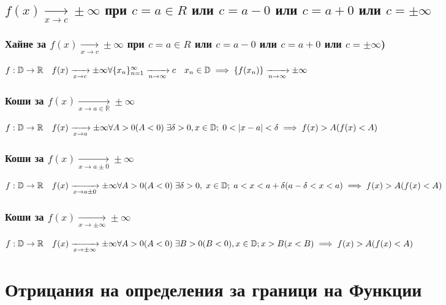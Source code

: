 \documentclass{article}
\newcommand{\pto}[2]{\xrightarrow[#1 \to #2]{}}
\newcommand{\xto}[1]{\pto{x}{#1}}
\newcommand{\nto}[0]{\pto{n}{\infty}}
\newcommand{\R}[0]{\mathbb{R}}
\newcommand{\D}[0]{\mathbb{D}}
\newcommand{\spc}[0]{\quad}
\newcommand{\seq}[1]{\{#1_n\}_{n=1}^{\infty}}
\begin{document}
    \subsection{\(f(x) \xto{c} \pm \infty\) при \(c = a \in R\) или \(c = a - 0\) или \(c = a + 0\) или \(c = \pm \infty\)}
    \subsubsection{Хайне за \(f(x) \xto{c} \pm \infty\) при \(c = a \in R\) или \(c = a - 0\) или \(c = a + 0\) или \(c = \pm \infty\))}
    \(f: \D \to \R \spc f(x) \xto{c} \pm \infty\\
    \forall \seq{x} \nto c \spc x_n \in \D\\
    \implies \{f(x_n)\} \nto \pm \infty\)
    \subsubsection{Коши за \(f(x) \xto{a \in \R} \pm \infty\)}
    \(f: \D \to \R \spc f(x) \xto{a} \pm \infty\\
    \forall A > 0 (A < 0) \; \exists \delta > 0, x \in \D; \; 0 < |x - a| < \delta\\
    \implies f(x) > A (f(x) < A)\)
    \subsubsection{Коши за \(f(x) \xto{a \pm 0} \pm \infty\)}
    \(f: \D \to \R \spc f(x) \xto{a \pm 0} \pm \infty\\
    \forall A > 0 (A < 0) \; \exists \delta > 0, \; x \in \D; \; a < x < a + \delta (a - \delta < x < a)\\
    \implies f(x) > A (f(x) < A)\)
    \subsubsection{Коши за \(f(x) \xto{\pm \infty} \pm \infty\)}
    \(f: \D \to \R \spc f(x) \xto{\pm \infty} \pm \infty\\
    \forall A > 0 (A < 0) \; \exists B > 0 (B < 0), x \in \D; x > B (x < B)\\
    \implies f(x) > A (f(x) < A)\)
    \section{Отрицания на определения за граници на Функции}
\end{document}

